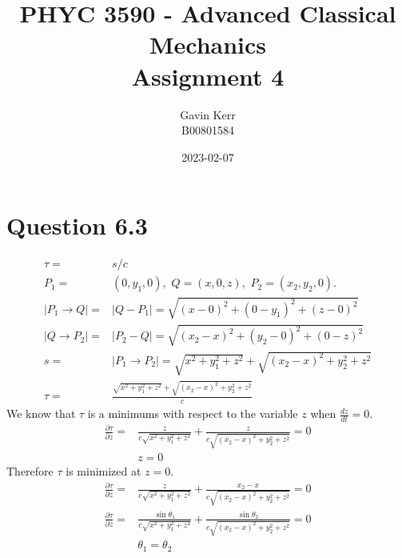 \documentclass[12pt, a4paper]{article}
\title{PHYC 3590 - Advanced Classical Mechanics\\Assignment 4}
\author{Gavin Kerr\\B00801584}
\date{2023-02-07}
\begin{document}
\maketitle



\section*{Question 6.3}
\begin{align*}
\tau =& s/c
\\
P_1 =& (0, y_1 , 0), \,\, Q = (x, 0, z), \,\, P_2 = (x_2 , y_2 , 0).
\\
|P_1 \rightarrow Q| =& |Q-P_1|  = \sqrt{(x-0)^2+(0-y_1)^2+(z-0)^2}
\\
|Q \rightarrow P_2| =& |P_2-Q|  = \sqrt{(x_2-x)^2+(y_2-0)^2+(0-z)^2}
\\
s =& |P_1\rightarrow P_2| = \sqrt{x^2+y_1^2+z^2} + \sqrt{(x_2-x)^2+y_2^2+z^2}
\\
\tau =& \boxed{\frac{\sqrt{x^2+y_1^2+z^2} + \sqrt{(x_2-x)^2+y_2^2+z^2}}{c}}
\end{align*}
We know that $\tau$ is a minimums with respect to the variable $z$ when $\frac{dz}{dt}=0$.
\begin{align*}
\frac{\partial \tau}{\partial z} =& \frac{z}{c\sqrt{x^2+y_1^2+z^2}} + \frac{z}{c\sqrt{(x_2-x)^2+y_2^2+z^2}} = 0
\\
&\boxed{z=0}
\end{align*}
Therefore $\tau$ is minimized at $z=0$.
\begin{align*}
\frac{\partial \tau}{\partial z} =& \frac{z}{c\sqrt{x^2+y_1^2+z^2}} + \frac{x_2-x}{c\sqrt{(x_2-x)^2+y_2^2+z^2}} = 0
\\
\frac{\partial \tau}{\partial z} =& \frac{\sin\theta_1}{c\sqrt{x^2+y_1^2+z^2}} + \frac{\sin\theta_2}{c\sqrt{(x_2-x)^2+y_2^2+z^2}} = 0
\\
&\boxed{\theta_1 = \theta_2}
\end{align*}
\end{document}
